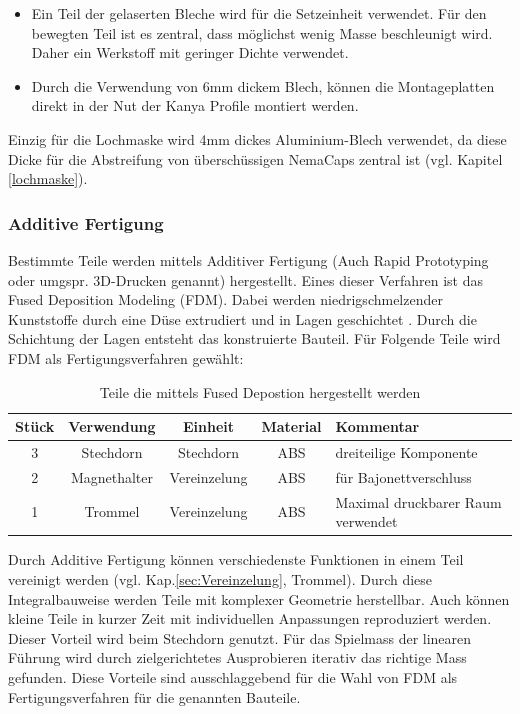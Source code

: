 \begin{itemize}
	\item Ein Teil der gelaserten Bleche wird für die Setzeinheit verwendet. Für den bewegten Teil ist es zentral, dass möglichst wenig Masse beschleunigt wird. Daher ein Werkstoff mit geringer Dichte verwendet.
	
	\item Durch die Verwendung von 6mm dickem Blech, können die Montageplatten direkt in der Nut der Kanya Profile montiert werden.
\end{itemize}

Einzig für die Lochmaske wird 4mm dickes Aluminium-Blech verwendet, da diese Dicke für die Abstreifung von überschüssigen NemaCaps zentral ist (vgl. Kapitel \ref{lochmaske}).

\subsubsection{Additive Fertigung}
Bestimmte Teile werden mittels Additiver Fertigung (Auch Rapid Prototyping oder umgspr. 3D-Drucken genannt) hergestellt. Eines dieser Verfahren ist das Fused Deposition Modeling (FDM). Dabei werden niedrigschmelzender Kunststoffe durch eine Düse extrudiert und in Lagen geschichtet \cite{fdm}. Durch die Schichtung der Lagen entsteht das konstruierte Bauteil. Für Folgende Teile wird FDM als Fertigungsverfahren gewählt:

\begin{table}[H]
\begin{tabular}{|c|c|c|c|l|}
	\hline 
	Stück & Verwendung & Einheit & Material & Kommentar \\ 
	\hline 
	3 & Stechdorn & Stechdorn & ABS & dreiteilige Komponente \\ 
	\hline 
	2 & Magnethalter & Vereinzelung & ABS & für Bajonettverschluss \\ 
	\hline 
	1 & Trommel & Vereinzelung & ABS & Maximal druckbarer Raum verwendet \\ 
	\hline 
\end{tabular} 
	\caption{Teile die mittels Fused Depostion hergestellt werden}
	\label{tab:fdm}
\end{table} 

Durch Additive Fertigung können verschiedenste Funktionen in einem Teil vereinigt werden (vgl. Kap.\ref{sec:Vereinzelung}, Trommel). Durch diese Integralbauweise werden Teile mit komplexer Geometrie herstellbar. Auch können kleine Teile in kurzer Zeit mit individuellen Anpassungen reproduziert werden. Dieser Vorteil wird beim Stechdorn genutzt. Für das Spielmass der linearen Führung wird durch zielgerichtetes Ausprobieren iterativ das richtige Mass gefunden. Diese Vorteile sind ausschlaggebend für die Wahl von FDM als Fertigungsverfahren für die genannten Bauteile.
\newline

